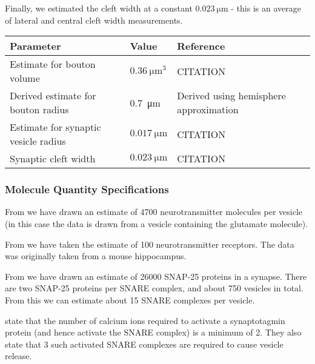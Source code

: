 \documentclass[a4paper]{article}
\begin{document}
Finally, we estimated the cleft width at a constant $\SI{0.023}{\micro\meter}$ - this is an average of lateral and central cleft width measurements.

\begin{table}[H]
\begin{tabular}{lll}
Parameter & Value & Reference \\ \hline
Estimate for bouton volume&  $\SI{0.36}{\micro\meter\cubed}$& CITATION \\ 
Derived estimate for bouton radius & \SI{0.7}{\micro\meter} & Derived using hemisphere approximation\\
Estimate for synaptic vesicle radius & $\SI{0.017}{\micro\meter}$ & CITATION \\ 
Synaptic cleft width &$\SI{0.023}{\micro\meter}$& CITATION\\
\end{tabular}
\end{table}

\subsubsection{Molecule Quantity Specifications}
From \cite{Bruns:Nature:1995} we have drawn an estimate of 4700 neurotransmitter molecules per vesicle (in this case the data is drawn from a vesicle containing the glutamate molecule).

From \cite{Stricker:JPhysiol:1996} we have taken the estimate of 100 neurotransmitter receptors. The data was originally taken from a mouse hippocampus. 

From \cite{Wilhelm:Science:2014} we have drawn an estimate of 26000 SNAP-25 proteins in a synapse. There are two SNAP-25 proteins per SNARE complex, and about 750 vesicles in total. From this we can estimate about 15 SNARE complexes per vesicle. 

\cite{Dittrich:BiophysJ:2013} state that the number of calcium ions required to activate a synaptotagmin protein (and hence activate the SNARE complex) is a minimum of 2. They also state that 3 such activated SNARE complexes are required to cause vesicle release. 
\end{document}
